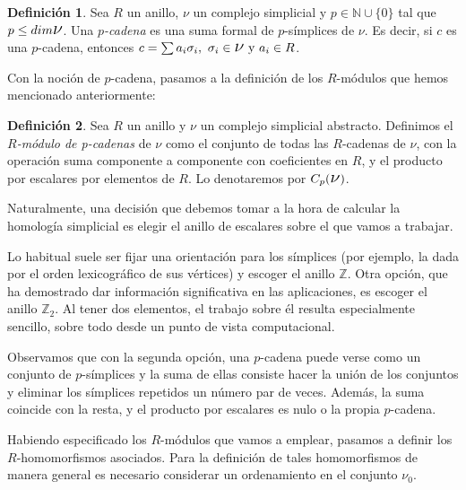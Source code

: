 \documentclass[12pt, a4paper, twoside]{book}
\numberwithin{equation}{section}
\theoremstyle{definition}
\newtheorem{defi}{Definición}[section]
\theoremstyle{remark}
\theoremstyle{plain}
\begin{document}
	\begin{defi}
		Sea $R$ un anillo, {\Large $\nu$} un complejo simplicial y $p 
		\in \mathbb{N}\cup\{0\}$ 
		tal que $p\leq dim \text{{\Large $\nu$}}$. Una 
		\textit{$p$-cadena} es una suma formal de $p$-símplices de 
		{\Large $\nu$}. Es decir, si $c$ es una $p$-cadena, entonces 
		$c=\sum a_{i}\sigma_{i},\ \sigma_{i} \in 
		\text{{\Large $\nu$}}\text{ y } 
		a_{i} \in R$. 
	\end{defi}
	
	Con la noción de $p$-cadena, pasamos a la definición de los 
	$R$-módulos que hemos mencionado anteriormente:
	\begin{defi}
		Sea $R$ un anillo y {\Large $\nu$} un complejo simplicial 
		abstracto. Definimos
		el \textit{$R$-módulo de p-cadenas} de 
		{\Large $\nu$} como el conjunto de todas las $R$-cadenas de 
		{\Large $\nu$}, con la operación suma componente a componente 
		con coeficientes en $R$, y el producto por escalares 
		por elementos de $R$. Lo denotaremos por 
		$C_{p}(\text{{\Large $\nu$}})$. 	
	\end{defi}

	Naturalmente, una decisión que debemos tomar a la hora de calcular la 
	homología simplicial es elegir el anillo de escalares sobre el que 
	vamos a trabajar. 

	Lo habitual suele ser fijar una orientación para los 
	símplices (por ejemplo, la dada por el orden lexicográfico de sus 
	vértices) y escoger el anillo $\mathbb{Z}$. Otra opción, que ha 
	demostrado dar información significativa en las aplicaciones, es 
	escoger el anillo $\mathbb{Z}_{2}$. Al tener dos elementos, el trabajo 
	sobre él resulta especialmente sencillo, sobre todo desde un punto de 
	vista computacional.

	Observamos que con la segunda opción, una $p$-cadena puede verse como
	un conjunto de $p$-símplices y la suma de ellas consiste hacer la 
	unión de los conjuntos y eliminar los símplices repetidos un número 
	par de veces. Además, la suma coincide con la resta, y el producto por 
	escalares es nulo o la propia $p$-cadena.
	
	Habiendo especificado los $R$-módulos que vamos a emplear, pasamos a
	definir los $R$-homomorfismos asociados. Para la definición de tales 
	homomorfismos de manera general es necesario considerar un 
	ordenamiento en el conjunto {\Large $\nu$}$_{0}$. 
\end{document}
